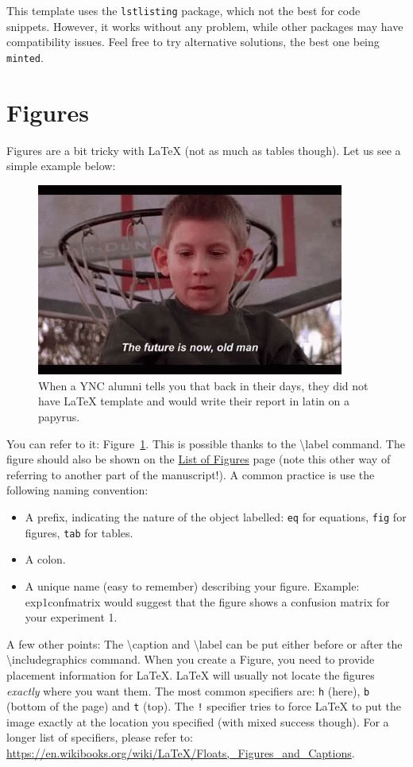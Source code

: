 This template uses the \texttt{lstlisting} package, which not the best for code snippets.
However, it works without any problem, while other packages may have compatibility issues.
Feel free to try alternative solutions, the best one being \texttt{minted}.

\section{Figures}
Figures are a bit tricky with LaTeX {\tiny(not as much as tables though)}.
Let us see a simple example below:
\begin{figure}[!h]
  \centering
    \includegraphics[width=0.9\textwidth]{figures/future.png}
  \caption{When a YNC alumni tells you that back in their days, they did not have LaTeX template and would write their report in latin on a papyrus.}
  \label{fig:future}
\end{figure}
You can refer to it: Figure~\ref{fig:future}.
This is possible thanks to the \textbackslash{}label command.
The figure should also be shown on the \hyperref[lst:figs]{List of Figures} page (note this other way of referring to another part of the manuscript!).
A common practice is use the following naming convention:
\begin{itemize}
  \item A prefix, indicating the nature of the object labelled: \texttt{eq} for equations, \texttt{fig} for figures, \texttt{tab} for tables.
  \item A colon.
  \item A unique name (easy to remember) describing your figure. Example: exp1confmatrix would suggest that the figure shows a confusion matrix for your experiment 1.
\end{itemize}

A few other points: The \textbackslash{}caption and \textbackslash{}label can be put either before or after the \textbackslash{}includegraphics command.
When you create a Figure, you need to provide placement information for LaTeX. LaTeX will usually not locate the figures \emph{exactly} where you want them.
The most common specifiers are: \texttt{h} (here), \texttt{b} (bottom of the page) and \texttt{t} (top). The \texttt{!} specifier tries to force LaTeX to put the image exactly at the location you specified (with mixed success though).
For a longer list of specifiers, please refer to: \url{https://en.wikibooks.org/wiki/LaTeX/Floats,_Figures_and_Captions}.

